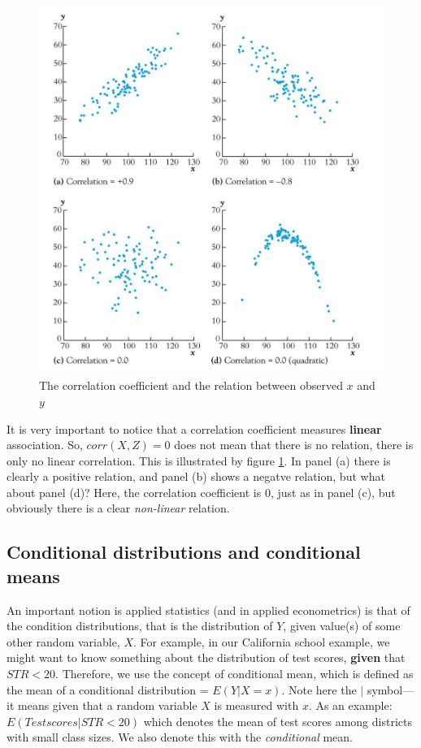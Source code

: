 \documentclass[
]{book}
\begin{document}
\begin{figure}
\includegraphics[width=14.01in]{./figures/Sheet27} \caption{The correlation coefficient and the relation between observed $x$ and $y$}\label{fig:corrcoef}
\end{figure}

It is very important to notice that a correlation coefficient measures \textbf{linear} association. So, \(corr(X,Z) = 0\) does not mean that there is no relation, there is only no linear correlation. This is illustrated by figure \ref{fig:corrcoef}. In panel (a) there is clearly a positive relation, and panel (b) shows a negatve relation, but what about panel (d)? Here, the correlation coefficient is 0, just as in panel (c), but obviously there is a clear \emph{non-linear} relation.

\hypertarget{conditional-distributions-and-conditional-means}{%
\subsection{Conditional distributions and conditional means}\label{conditional-distributions-and-conditional-means}}

An important notion is applied statistics (and in applied econometrics) is that of the condition distributions, that is the distribution of \(Y\), given value(s) of some other random variable, \(X\). For example, in our California school example, we might want to know something about the distribution of test scores, \textbf{given} that \(STR < 20\). Therefore, we use the concept of conditional mean, which is defined as the mean of a conditional distribution = \(E(Y|X = x)\). Note here the \(|\) symbol---it means given that a random variable \(X\) is measured with \(x\). As an example: \(E(Test scores|STR < 20)\) which denotes the mean of test scores among districts with small class sizes. We also denote this with the \emph{conditional} mean.
\end{document}
